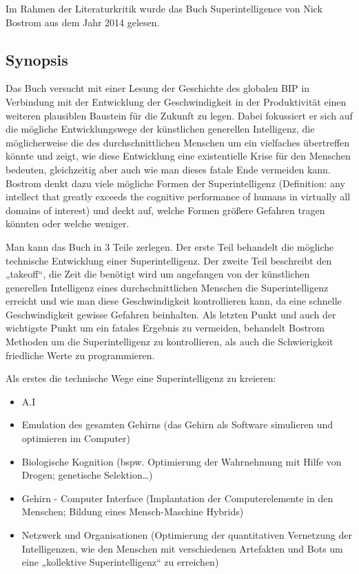 \documentclass[twoside, a4paper, DIV=11, open=any, bibliography=totoc]{scrbook}
\begin{document}
Im Rahmen der Literaturkritik wurde das Buch Superintelligence von Nick Bostrom aus dem Jahr 2014 gelesen.

\subsection{Synopsis} \label{sec:litsynops1}

Das Buch versucht mit einer Lesung der Geschichte des globalen BIP in Verbindung mit der Entwicklung der Geschwindigkeit in der Produktivität einen weiteren plausiblen Baustein für die Zukunft zu legen. Dabei fokussiert er sich auf die mögliche Entwicklungswege der künstlichen generellen Intelligenz, die möglicherweise die des durchschnittlichen Menschen um ein vielfaches übertreffen könnte und zeigt, wie diese Entwicklung eine existentielle Krise für den Menschen bedeuten, gleichzeitig aber auch wie man dieses fatale Ende vermeiden kann. Bostrom denkt dazu viele mögliche Formen der Superintelligenz (Definition: any intellect that greatly exceeds the cognitive performance of humans in virtually all domains of interest) und deckt auf, welche Formen größere Gefahren tragen könnten oder welche weniger.

Man kann das Buch in 3 Teile zerlegen. Der erste Teil behandelt die mögliche technische Entwicklung einer Superintelligenz. Der zweite Teil beschreibt den „takeoff“, die Zeit die benötigt wird um angefangen von der künstlichen generellen Intelligenz eines durchschnittlichen Menschen die Superintelligenz erreicht und wie man diese Geschwindigkeit kontrollieren kann, da eine schnelle Geschwindigkeit gewisse Gefahren beinhalten. Als letzten Punkt und auch der wichtigste Punkt um ein fatales Ergebnis zu vermeiden, behandelt Bostrom Methoden um die Superintelligenz zu kontrollieren, als auch die Schwierigkeit friedliche Werte zu programmieren.

Als erstes die technische Wege eine Superintelligenz zu kreieren: 

\begin{itemize}
    \item A.I
    \item  Emulation des gesamten Gehirns (das Gehirn als Software simulieren und optimieren im Computer)
    \item Biologische Kognition (bspw. Optimierung der Wahrnehmung mit Hilfe von Drogen; genetische Selektion…)
    \item Gehirn - Computer Interface (Implantation der Computerelemente in den Menschen; Bildung eines Mensch-Maschine Hybrids)
    \item Netzwerk und Organisationen (Optimierung der quantitativen Vernetzung der Intelligenzen, wie den Menschen mit verschiedenen Artefakten und Bots um eine „kollektive Superintelligenz“ zu erreichen)
\end{itemize}
\end{document}
